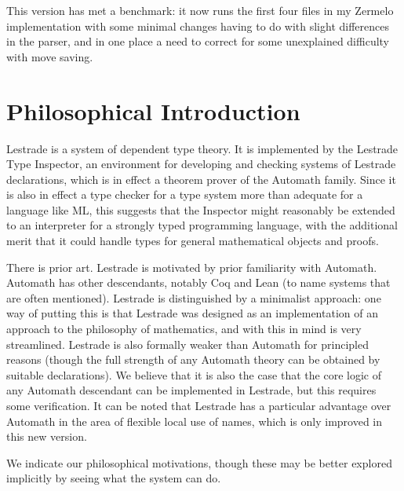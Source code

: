 \documentclass[12pt]{article}
\begin{document}
This version has met a benchmark:  it now runs the first four files in my Zermelo implementation with some minimal changes having to do with slight differences in the parser,
and in one place a need to correct for some unexplained difficulty with move saving.

\newpage

\section{Philosophical Introduction}

Lestrade is a system of dependent type theory.  It is implemented by the Lestrade Type Inspector, an environment for developing and checking systems of Lestrade declarations, which is in effect a theorem prover of the Automath family.  Since it is also in effect a type checker for a type system more than adequate for a language like ML, this suggests that the Inspector might reasonably be extended to an interpreter for a strongly typed programming language, with the additional merit that it could handle types for general mathematical objects and proofs.

There is prior art.  Lestrade is motivated by prior familiarity with Automath.  Automath has other descendants, notably Coq and Lean (to name systems that are often mentioned).  Lestrade is distinguished by a minimalist approach:  one way of putting this is that Lestrade was designed as an implementation of an approach to the philosophy of mathematics, and with this in mind is very streamlined.  Lestrade is also formally weaker than Automath for principled reasons (though the full strength of any Automath theory can be obtained by suitable declarations).  We believe that it is also the case that the core logic of any Automath descendant can be implemented in Lestrade, but this requires some verification.  It can be noted that Lestrade has a particular advantage over Automath in the area of flexible local use of names, which is only improved in this new version.

We indicate our philosophical motivations, though these may be better explored implicitly by seeing what the system can do.
\end{document}

